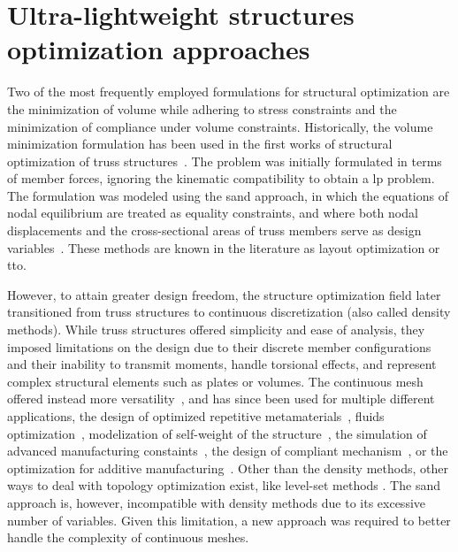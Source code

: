 \section{Ultra-lightweight structures optimization approaches}
Two of the most frequently employed formulations for structural optimization are the minimization of volume while adhering to stress constraints and the minimization of compliance under volume constraints. Historically, the volume minimization formulation has been used in the first works of structural optimization of truss structures~. The problem was initially formulated in terms of member forces, ignoring the kinematic compatibility to obtain a \gls{lp} problem. The formulation was modeled using the \gls{sand} approach, in which the equations of nodal equilibrium are treated as equality constraints, and where both nodal displacements and the cross-sectional areas of truss members serve as design variables~. These methods are known in the literature as layout optimization or \gls{tto}. 

However, to attain greater design freedom, the structure optimization field later transitioned from truss structures to continuous discretization (also called density methods). While truss structures offered simplicity and ease of analysis, they imposed limitations on the design due to their discrete member configurations and their inability to transmit moments, handle torsional effects, and represent complex structural elements such as plates or volumes. The continuous mesh offered instead more versatility~, and has since been used for multiple different applications, \eg the design of optimized repetitive metamaterials~, fluids optimization~, modelization of self-weight of the structure~, the simulation of advanced manufacturing constaints~, the design of compliant mechanism~, or the optimization for additive manufacturing~. Other than the density methods, other ways to deal with topology optimization exist, like level-set methods . The \gls{sand} approach is, however, incompatible with density methods due to its excessive number of variables. Given this limitation, a new approach was required to better handle the complexity of continuous meshes.

